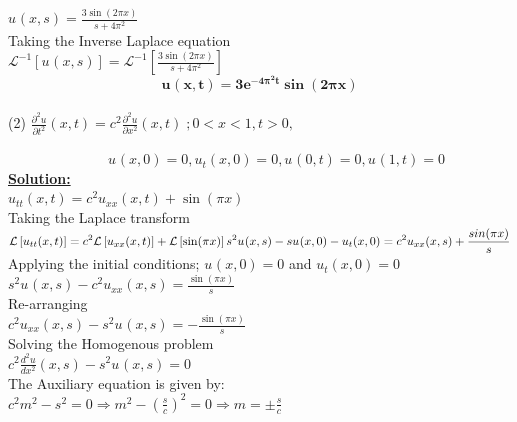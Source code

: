 \documentclass[12pt]{report}
\newcommand{\Laplace}{\mathcal{L}}
\newcommand{\Un}[2]{u_{#1}(#2)}
\newcommand{\NI}{\noindent}
\newcommand{\psq}{\pi^{2}}
\newcommand{\InverseL}[1]{\Laplace^{-1}\left[#1\right]}
\newcommand{\LT}[1]{\Laplace \left[#1\right]}
\begin{document}
\NI ${\displaystyle \Un{}{x,s} = \frac{3\sin(2\pi x)}{s + 4\pi^{2}}}$\\[0.5cm]

\NI Taking the Inverse Laplace equation\\[0.2cm]
$\displaystyle
\InverseL{\Un{}{x,s}} = \InverseL{\frac{3\sin(2\pi x)}{s + 4\psq}}
$\\[0.3cm]

$$ \mathbf{
\Un{}{x,t} = 3e^{-4\psq t}\sin(2\pi x)}
$$\\[1.0cm]

\NI (2) $\displaystyle \frac{\partial^2 u}{\partial t^2}(x,t) = c^2 \frac{\partial^2 u}{\partial x^2}(x,t) \; ; 0<x<1, t > 0, $

$\hspace{3cm} \displaystyle \Un{}{x,0} = 0, \Un{t}{x,0} = 0,  \Un{}{0,t} = 0,  \Un{}{1,t} = 0$\\

\NI \underline{\textbf{Solution:}} \\[0.2cm]
$\displaystyle \Un{tt}{x,t} = c^2 \Un{xx}{x,t} + \sin(\pi x) $\\[0.2cm]

\NI Taking the Laplace transform \\[0.2cm]
$\displaystyle
\LT{\Un{tt}{x,t}} = c^2 \LT{\Un{xx}{x,t}} + \LT{\sin(\pi x)} \\[0.1cm]
s^2 \Un{}{x,s} - s\Un{}{x,0} - \Un{t}{x,0} = c^2 \Un{xx}{x,s} + \frac{sin(\pi x)}{s}
$\\[0.2cm]

\NI Applying the initial conditions; $\Un{}{x,0} = 0$ and $\Un{t}{x,0} = 0 $ \\[0.2cm]
$\displaystyle
s^2\Un{}{x,s} - c^2 \Un{xx}{x,s} = \frac{\sin(\pi x)}{s}
$\\[0.2cm]

\NI Re-arranging \\[0.2cm]
$\displaystyle
c^2 \Un{xx}{x,s} - s^2 \Un{}{x,s} = - \frac{\sin(\pi x)}{s}
$\\[0.2cm]

\NI Solving the Homogenous problem \\[0.2cm]
$\displaystyle
c^{2} \frac{d^2 u}{dx^2}(x,s) - s^2 \Un{}{x,s} = 0
$\\[0.2cm]

\NI The Auxiliary equation is given by: \\[0.2cm]
$\displaystyle
c^2 m^2 - s^2 = 0 \Longrightarrow m^2 - \left(\frac{s}{c}\right)^2 = 0 \Longrightarrow m = \pm \frac{s}{c}
$\\[0.2cm]
\end{document}
